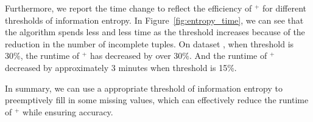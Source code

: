Furthermore, we report the time change to reflect the efficiency of \ours$^+$ for different thresholds of information entropy. In Figure~\ref{fig:entropy_time}, we can see that the algorithm spends less and less time as the threshold increases because of the reduction in the number of incomplete tuples. On dataset \imdbl, when threshold is 30\%, the runtime of \ours$^+$ has decreased by over 30\%. And the runtime of \ours$^+$ decreased by approximately 3 minutes when threshold is 15\%.



In summary, we can use a appropriate threshold of information entropy to preemptively fill in some missing values, which can effectively reduce the runtime of \ours$^+$ while ensuring accuracy. 